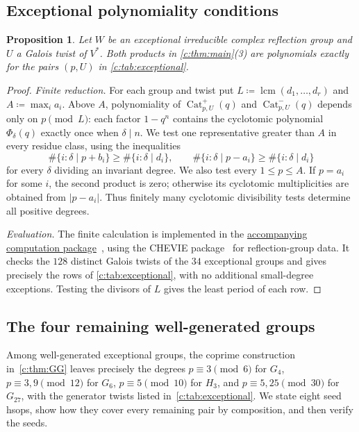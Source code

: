 \documentclass[10pt,a4paper]{amsart}
\newcommand{\defeq}{\coloneqq}
\DeclareMathOperator{\Cat}{Cat}
\newtheorem{proposition}[theorem]{Proposition}
\theoremstyle{definition}
\begin{document}
\subsection{Exceptional polynomiality conditions}\label{c:sec:certificates}

\begin{proposition}\label{c:prop:exceptional-polynomiality}
Let $W$ be an exceptional irreducible complex reflection group and
$U$ a Galois twist of $V^*$. Both products in \cref{c:thm:main}(3)
are polynomials exactly for the pairs $(p,U)$ in \cref{c:tab:exceptional}.
\end{proposition}

\begin{proof}
\emph{Finite reduction.}
For each group and twist put $L\defeq\operatorname{lcm}(d_1,\ldots,d_r)$ and
$A\defeq\max_i a_i$. Above $A$, polynomiality of
$\Cat^+_{p,U}(q)$ and $\Cat^-_{p,U}(q)$
depends only on $p\pmod L$: each factor $1-q^n$ contains the
cyclotomic polynomial $\Phi_\delta(q)$ exactly once when $\delta\mid n$.
We test one representative greater than
$A$ in every residue class, using the inequalities
\[
 \#\{i:\delta\mid p+b_i\}\geq\#\{i:\delta\mid d_i\},
 \qquad
 \#\{i:\delta\mid p-a_i\}\geq\#\{i:\delta\mid d_i\}
\]
for every $\delta$ dividing an invariant degree. We also test every
$1\leq p\leq A$. If $p=a_i$ for some $i$, the second product is zero;
otherwise its cyclotomic multiplicities are obtained from $|p-a_i|$.
Thus finitely many cyclotomic divisibility tests determine all
positive degrees.

\emph{Evaluation.}
The finite calculation is implemented in the
\href{https://personal.utdallas.edu/~nxw170830/docs/algebraic-hsops/}{accompanying computation package}~\cite{Computations},
using the CHEVIE package~\cite{GHLMP,Michel} for reflection-group data.
It checks the $128$ distinct Galois twists of the $34$ exceptional
groups and gives precisely the rows of \cref{c:tab:exceptional},
with no additional small-degree exceptions. Testing the divisors of
$L$ gives the least period of each row.
\end{proof}

\subsection{The four remaining well-generated groups}\label{c:sec:seeds}

Among well-generated exceptional groups, the coprime construction
in~\cref{c:thm:GG} leaves precisely the degrees
$p\equiv3\pmod6$ for $G_4$,
$p\equiv3,9\pmod{12}$ for $G_6$,
$p\equiv5\pmod{10}$ for $H_3$, and
$p\equiv5,25\pmod{30}$ for $G_{27}$, with the generator twists
listed in~\cref{c:tab:exceptional}.
We state eight seed hsops, show how they cover every remaining pair
by composition, and then verify the seeds.
\end{document}
